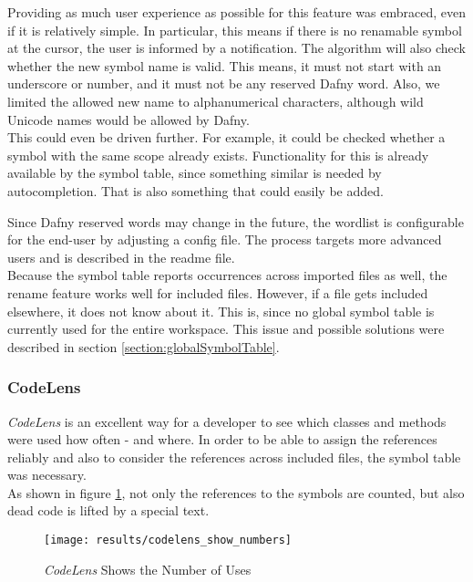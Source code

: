 Providing as much user experience as possible for this feature was embraced, even if it is relatively simple.
In particular, this means if there is no renamable symbol at the cursor, the user is informed by a notification.
The algorithm will also check whether the new symbol name is valid.
This means, it must not start with an underscore or number, and it must not be any reserved Dafny word.
Also, we limited the allowed new name to alphanumerical characters, although wild Unicode names would be allowed by Dafny.\\

This could even be driven further.
For example, it could be checked whether a symbol with the same scope already exists.
Functionality for this is already available by the symbol table, since something similar is needed by autocompletion.
That is also something that could easily be added.

Since Dafny reserved words may change in the future, the wordlist is configurable for the end-user by adjusting a config file.
The process targets more advanced users and is described in the readme file.\\

Because the symbol table reports occurrences across imported files as well, the rename feature works well for included files.
However, if a file gets included elsewhere, it does not know about it.
This is, since no global symbol table is currently used for the entire workspace.
This issue and possible solutions were described in section \ref{section:globalSymbolTable}.\\

\subsubsection{CodeLens}
\textit{CodeLens} is an excellent way for a developer to see which classes and methods were used how often - and where.
In order to be able to assign the references reliably and
also to consider the references across included files, the symbol table was necessary. \\

As shown in figure \ref{fig:result_codelens_references},
not only the references to the symbols are counted,
but also dead code is lifted by a special text.

\begin{figure}[H]
    \centering
    \texttt{[image: results/codelens\_show\_numbers]}
    \caption{\textit{CodeLens} Shows the Number of Uses}
    \label{fig:result_codelens_references}
\end{figure}


